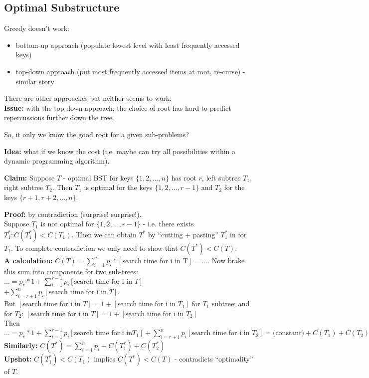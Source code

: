 \documentclass{scrartcl}
\begin{document}
\subsection{Optimal Substructure}
\label{sec:12-2}
Greedy doesn't work:
\begin{itemize}
\item bottom-up approach (populate lowest level with least frequently accessed
  keys)
\item top-down approach (put most frequently accessed items at root, re-curse) -
  similar story
\end{itemize}
There are other approaches but neither seems to work.\\
{\bf Issue: } with the top-down approach, the choice of root has hard-to-predict
repercussions further down the tree.

So, it only we know the good root for a given sub-problems?

{\bf Idea: } what if we know the cost (i.e. maybe can try all possibilities
within a dynamic programming algorithm).

{\bf Claim: } Suppose $T$ - optimal BST for keys $\{1, 2, \dots, n\}$ has root
$r$, left subtree $T_1$, right subtree $T_2$. Then $T_1$ is optimal for the keys
$\{1, 2, \dots, r-1\}$ and $T_2$ for the keys $\{r+1, r+2, \dots, n\}$.

{\bf Proof: } by contradiction (surprise! surprise!). \\
Suppose $T_1$ is not optimal for $\{1, 2, \dots, r-1\}$ - i.e. there exists
$T^*_1: C(T^*_1) < C(T_1)$. Then we can obtain $T^*$ by ``cutting + pasting''
$T^*_1$ in for $T_1$. To complete contradiction we only need to show that
$C(T^*) < C(T)$:\\
{\bf A calculation: } $C(T) = \sum \limits_{i=1}^n p_i*[\text{search time for i
  in T}]= ...$. Now brake this sum into components for two sub-trees: $\dots =
p_r * 1 + \sum \limits_{i=1}^{r-1} p_i [\text{search time for i in }T]$ $+\sum
\limits_{i=r + 1}^{n} p_i [\text{search time for i in }T]$.\\
But $[\text{search time for i in }T] = 1 + [\text{search time for i in }T_1]$
for $T_1$ subtree; and for $T_2$: $[\text{search time for i in }T] = 1 +
[\text{search time for i in }T_2]$\\
Then $\dots = p_r * 1 + \sum \limits_{i=1}^{r-1} p_i [\text{search time for i in
}T_1] + \sum \limits_{i=r + 1}^{n} p_i [\text{search time for i in }T_2] =
\text{(constant)} + C(T_1) + C(T_2)$\\
{\bf Similarly: } $C(T^*) = \sum \limits_{i=1}^n p_i + C(T^*_1) + C(T^*_2)$\\
{\bf Upshot: } $C(T_1^*) < C(T_1)$ implies $C(T^*) < C(T)$ - contradicts
``optimality'' of $T$.
\end{document}

